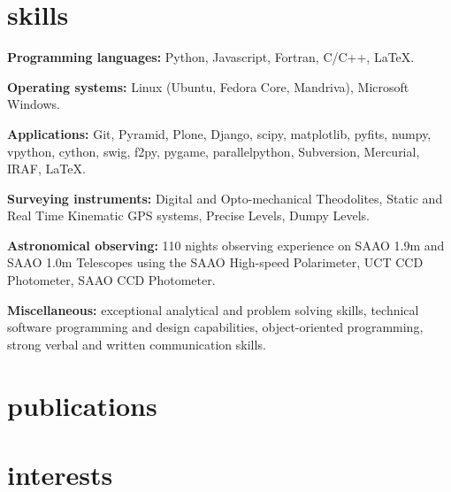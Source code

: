 \documentclass[]{friggeri-cv} %
\begin{document}

\section{skills}

\textbf{Programming languages:} Python, Javascript, Fortran, C/C++, \LaTeX.

\textbf{Operating systems:} Linux (Ubuntu, Fedora Core, Mandriva), Microsoft Windows.

\textbf{Applications:} Git, Pyramid, Plone, Django, scipy, matplotlib, pyfits, numpy, vpython, cython, swig, f2py, pygame, parallelpython, Subversion, Mercurial, IRAF, \LaTeX.

\textbf{Surveying instruments:} Digital and Opto-mechanical Theodolites, Static and Real Time Kinematic GPS
    systems, Precise Levels, Dumpy Levels.
    
\textbf{Astronomical observing:} 110 nights observing experience on SAAO 1.9m and SAAO 1.0m Telescopes using
     the SAAO High-speed Polarimeter, UCT CCD Photometer, SAAO CCD Photometer.

\textbf{Miscellaneous:} exceptional analytical and problem solving skills, technical software programming and design capabilities, object-oriented programming, strong verbal and written communication skills.



\begin{entrylist}
\end{entrylist}

\pagebreak
\section{publications}


\section{interests}
\end{document}
